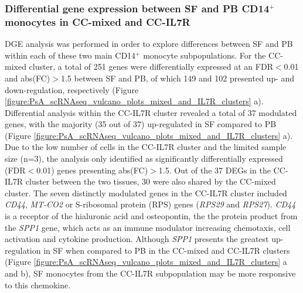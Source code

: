 \subsubsection{Differential gene expression between SF and PB CD14$^+$ monocytes in CC-mixed and CC-IL7R}
DGE analysis was performed in order to explore differences between SF and PB within each of these two main CD14$^+$ monocyte subpopulations. For the CC-mixed cluster, a total of 251 genes were differentially expressed at an FDR$<$0.01 and abs(FC)$>$1.5 between SF and PB, of which 149 and 102 presented up- and down-regulation, respectively (Figure \ref{figure:PsA_scRNAseq_vulcano_plots_mixed_and_IL7R_clusters} a). Differential analysis within the CC-IL7R cluster revealed a total of 37 modulated genes, with the majority (35 out of 37) up-regulated in SF compared to PB (Figure \ref{figure:PsA_scRNAseq_vulcano_plots_mixed_and_IL7R_clusters} a). Due to the low number of cells in the CC-IL7R cluster and the limited sample size (n=3), the analysis only identified as significantly differentially expressed (FDR$<$0.01) genes presenting abs(FC)$>$1.5. Out of the 37 DEGs in the CC-IL7R cluster between the two tissues, 30 were also shared by the CC-mixed cluster. The seven distinctly modulated genes in the CC-IL7R cluster included \textit{CD44}, \textit{MT-CO2} or S-ribosomal protein (RPS) genes (\textit{RPS29} and \textit{RPS27}). \textit{CD44} is a receptor of the hialuronic acid and osteopontin, the the protein product from the \textit{SPP1} gene, which acts as an immune modulator increasing chemotaxis, cell activation and cytokine production. Although \textit{SPP1} presents the greatest up-regulation in SF when compared to PB in the CC-mixed and CC-IL7R clusters (Figure \ref{figure:PsA_scRNAseq_vulcano_plots_mixed_and_IL7R_clusters} a and b), SF monocytes from the CC-IL7R subpopulation may be more responsive to this chemokine.


